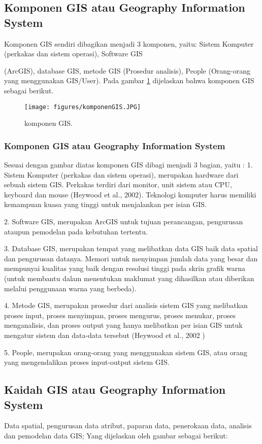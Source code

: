 \subsection{Komponen GIS atau Geography Information System}
Komponen GIS sendiri dibagikan menjadi 3 komponen, yaitu:
Sistem Komputer (perkakas dan sistem operasi), Software GIS

(ArcGIS), database GIS, metode GIS (Prosedur analisis), People (Orang-orang yang menggunakan GIS/User).
Pada gambar \ref{komponen GIS} dijelaskan bahwa komponen GIS sebagai berikut.


\begin{figure}[ht]
	\centerline{\texttt{[image: figures/komponenGIS.JPG]}}
	\caption{komponen GIS.}
	\label{komponen GIS}
	\end{figure}

\subsubsection{Komponen GIS atau Geography Information System}
Sesuai dengan gambar diatas komponen GIS dibagi menjadi 3 bagian, yaitu :
1. Sistem Komputer (perkakas dan sistem operasi), merupakan hardware dari sebuah sistem GIS. Perkakas terdiri dari monitor, unit sistem atau CPU, keyboard dan mouse (Heywood et al., 2002). Teknologi komputer harus memiliki kemampuan kuasa
yang tinggi untuk menjalankan per isian GIS.

2. Software GIS, merupakan ArcGIS untuk tujuan perancangan, pengurusan ataupun pemodelan pada kebutuhan tertentu.

3. Database GIS, merupakan tempat yang melibatkan data GIS baik data spatial dan pengurusan datanya. Memori untuk menyimpan jumlah data yang besar dan mempunyai kualitas yang baik dengan resolusi tinggi pada skrin grafik warna (untuk membantu dalam menentukan maklumat yang dihasilkan atau diberikan melalui penggunaan warna yang berbeda).

4. Metode GIS, merupakan prosedur dari analisis sistem GIS yang melibatkan proses input, proses menyimpan, proses mengurus, proses menukar, proses menganalisis, dan proses output yang hanya melibatkan per isian GIS untuk mengatur sistem dan data-data tersebut (Heywood et al., 2002 )

5. People, merupakan orang-orang yang menggunakan sistem GIS, atau orang yang mengendalikan proses input-output sistem GIS. 


\subsection{Kaidah GIS atau Geography Information System}
Data spatial, pengurusan data atribut, paparan data, penerokaan data, analisis dan pemodelan data GIS;
Yang dijelaskan oleh gambar sebagai berikut:

